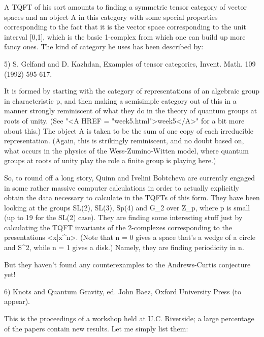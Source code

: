 A TQFT of his sort amounts to finding a symmetric tensor category of
vector spaces and an object A in this category with some special
properties corresponding to the fact that it is the vector space
corresponding to the unit interval [0,1], which is the basic 1-complex
from which one can build up more fancy ones.  The kind of category he
uses has been described by:

5)  S. Gelfand and D. Kazhdan, Examples of tensor categories, Invent.
Math. 109 (1992) 595-617.

It is formed by starting with the category of representations of an
algebraic group in characteristic p, and then making a semisimple
category out of this in a manner strongly reminiscent of what they do in
the theory of quantum groups at roots of unity.  (See "<A HREF = "week5.html">week5</A>" for a bit
more about this.)  The object A is taken to be the sum of one copy of
each irreducible representation.  (Again, this is strikingly
reminiscent, and no doubt based on, what occurs in the physics of the
Wess-Zumino-Witten model, where quantum groups at roots of unity play
the role a finite group is playing here.)  

So, to round off a long story, Quinn and Ivelini Bobtcheva are currently
engaged in some rather massive computer calculations in order to
actually explicitly obtain the data necessary to calculate in the TQFTs
of this form.  They have been looking at the groups SL(2), SL(3), Sp(4)
and G_2 over Z_p, where p is small (up to 19 for the SL(2) case).  They
are finding some interesting stuff just by calculating the TQFT
invariants of the 2-complexes corresponding to the presentations
<x|x^n>.  (Note that n = 0 gives a space that's a wedge of a circle and
S^2, while n = 1 gives a disk.)  Namely, they are finding periodicity in
n.  

But they haven't found any counterexamples to the Andrews-Curtis
conjecture yet!



6) Knots and Quantum Gravity, ed. John Baez, Oxford University Press (to
appear).  

This is the proceedings of a workshop held at U.C. Riverside; a large
percentage of the papers contain new results.  Let me simply list them:


